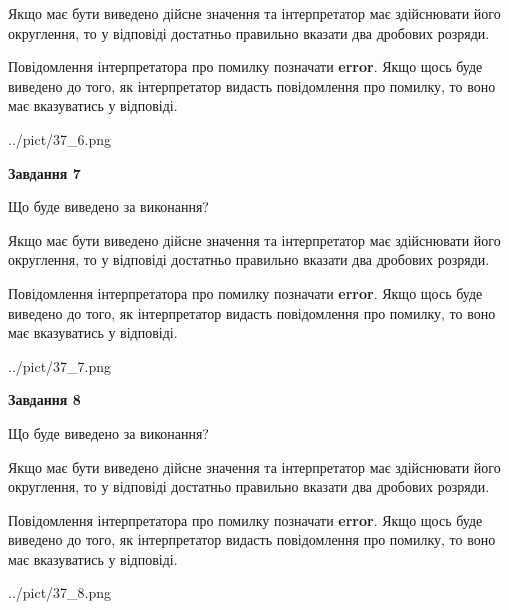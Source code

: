\documentclass[12pt, ukrainian]{article}
\begin{document}
{\begin {Large}
Якщо має бути виведено дійсне значення та інтерпретатор має здійснювати його округлення, 
то у відповіді достатньо правильно вказати два дробових розряди.

Повідомлення інтерпретатора про помилку позначати \textbf{error}.
Якщо щось буде виведено до того, як інтерпретатор видасть повідомлення про помилку, 
то воно має вказуватись у відповіді. \par

\begin{center}
	{../pict/37_6.png}
\end{center}
\newpage

{\begin {center}\textbf{Завдання 7}\end {center}}\par
Що буде виведено за виконання? \par

Якщо має бути виведено дійсне значення та інтерпретатор має здійснювати його округлення, 
то у відповіді достатньо правильно вказати два дробових розряди.

Повідомлення інтерпретатора про помилку позначати \textbf{error}.
Якщо щось буде виведено до того, як інтерпретатор видасть повідомлення про помилку, 
то воно має вказуватись у відповіді. \par

\begin{center}
	{../pict/37_7.png}
\end{center}
\newpage

{\begin {center}\textbf{Завдання 8}\end {center}}\par
Що буде виведено за виконання? \par

Якщо має бути виведено дійсне значення та інтерпретатор має здійснювати його округлення, 
то у відповіді достатньо правильно вказати два дробових розряди.

Повідомлення інтерпретатора про помилку позначати \textbf{error}.
Якщо щось буде виведено до того, як інтерпретатор видасть повідомлення про помилку, 
то воно має вказуватись у відповіді. \par

\begin{center}
	{../pict/37_8.png}
\end{center}
\newpage


\end{Large}}
\end{document}
